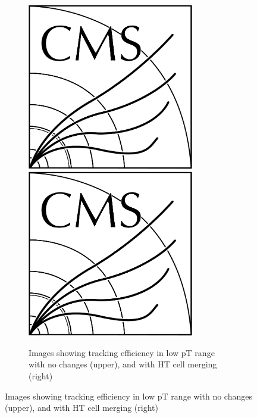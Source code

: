 \begin{figure}[tb]
\begin{figure}[tbp]
\centering
\includegraphics[width=0.8\textwidth,trim={1.1truecm 0truecm 1truecm 12truecm},clip]{CMS-bw-logo.pdf}
\includegraphics[width=0.8\textwidth,trim={0.7truecm 0truecm 1truecm 0truecm},clip]{CMS-bw-logo.pdf}
\caption{Images showing tracking efficiency in low pT range with no changes (upper), and with HT cell merging (right)}
\label{fig:2GeVFlat}
\end{figure}



\end{figure}
